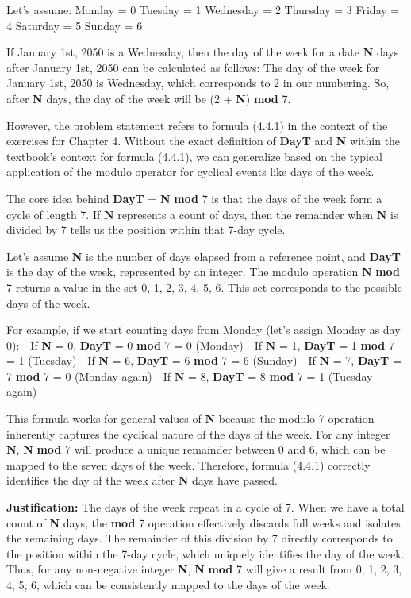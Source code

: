 \documentclass{article}
\begin{document}
Let's assume:
Monday = 0
Tuesday = 1
Wednesday = 2
Thursday = 3
Friday = 4
Saturday = 5
Sunday = 6

If January 1st, 2050 is a Wednesday, then the day of the week for a date \textbf{N} days after January 1st, 2050 can be calculated as follows:
The day of the week for January 1st, 2050 is Wednesday, which corresponds to 2 in our numbering.
So, after \textbf{N} days, the day of the week will be (2 + \textbf{N}) \textbf{mod} 7.

However, the problem statement refers to formula (4.4.1) in the context of the exercises for Chapter 4. Without the exact definition of \textbf{DayT} and \textbf{N} within the textbook's context for formula (4.4.1), we can generalize based on the typical application of the modulo operator for cyclical events like days of the week.

The core idea behind \textbf{DayT} = \textbf{N} \textbf{mod} 7 is that the days of the week form a cycle of length 7. If \textbf{N} represents a count of days, then the remainder when \textbf{N} is divided by 7 tells us the position within that 7-day cycle.

Let's assume \textbf{N} is the number of days elapsed from a reference point, and \textbf{DayT} is the day of the week, represented by an integer. The modulo operation \textbf{N} \textbf{mod} 7 returns a value in the set {0, 1, 2, 3, 4, 5, 6}. This set corresponds to the possible days of the week.

For example, if we start counting days from Monday (let's assign Monday as day 0):
- If \textbf{N} = 0, \textbf{DayT} = 0 \textbf{mod} 7 = 0 (Monday)
- If \textbf{N} = 1, \textbf{DayT} = 1 \textbf{mod} 7 = 1 (Tuesday)
- If \textbf{N} = 6, \textbf{DayT} = 6 \textbf{mod} 7 = 6 (Sunday)
- If \textbf{N} = 7, \textbf{DayT} = 7 \textbf{mod} 7 = 0 (Monday again)
- If \textbf{N} = 8, \textbf{DayT} = 8 \textbf{mod} 7 = 1 (Tuesday again)

This formula works for general values of \textbf{N} because the modulo 7 operation inherently captures the cyclical nature of the days of the week. For any integer \textbf{N}, \textbf{N} \textbf{mod} 7 will produce a unique remainder between 0 and 6, which can be mapped to the seven days of the week. Therefore, formula (4.4.1) correctly identifies the day of the week after \textbf{N} days have passed.

\textbf{Justification:}
The days of the week repeat in a cycle of 7. When we have a total count of \textbf{N} days, the \textbf{mod} 7 operation effectively discards full weeks and isolates the remaining days. The remainder of this division by 7 directly corresponds to the position within the 7-day cycle, which uniquely identifies the day of the week. Thus, for any non-negative integer \textbf{N}, \textbf{N} \textbf{mod} 7 will give a result from {0, 1, 2, 3, 4, 5, 6}, which can be consistently mapped to the days of the week.
\end{document}
